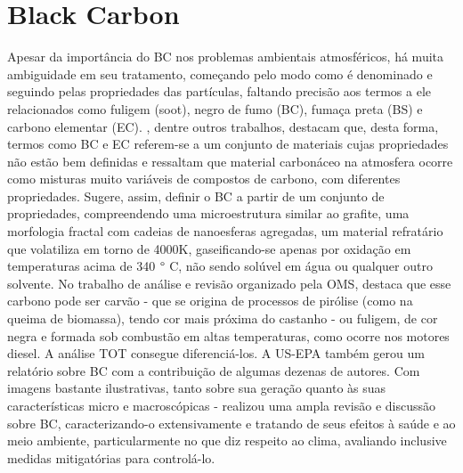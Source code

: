 \newpage
\section{Black Carbon}

Apesar da importância do BC nos problemas ambientais atmosféricos, há muita 
ambiguidade em seu tratamento, começando pelo modo como é denominado e seguindo
pelas propriedades das partículas, faltando precisão aos termos a ele 
relacionados como fuligem (soot), negro de fumo (BC), fumaça preta (BS) e 
carbono elementar (EC). \citet{petzold2013}, dentre outros trabalhos, 
destacam que, desta forma, termos como BC e EC referem-se a um conjunto de 
materiais cujas propriedades não estão bem definidas e ressaltam que material 
carbonáceo na atmosfera ocorre como misturas muito variáveis de compostos de 
carbono, com diferentes propriedades. Sugere, assim, definir o BC a partir de 
um conjunto de propriedades, compreendendo uma microestrutura similar ao grafite,
uma morfologia fractal com cadeias de nanoesferas agregadas, um material 
refratário que volatiliza em torno de 4000K, gaseificando-se apenas por oxidação
em temperaturas acima de 340 $\degree$ C, não sendo solúvel em água ou qualquer
outro solvente. No trabalho de análise e revisão organizado pela OMS, 
\citet{janssen2012} destaca que esse carbono pode ser carvão - que se origina
de processos de pirólise (como na queima de biomassa), tendo cor mais próxima do
castanho - ou fuligem, de cor negra e formada sob combustão em altas 
temperaturas, como ocorre nos motores diesel. A análise TOT consegue 
diferenciá-los. A US-EPA também gerou um relatório sobre BC \citep{epa2012} com
a contribuição de algumas dezenas de autores. Com imagens bastante ilustrativas, 
tanto sobre sua geração quanto às suas características micro e macroscópicas - 
realizou uma ampla revisão e 
discussão sobre BC, caracterizando-o extensivamente e tratando de seus efeitos 
à saúde e ao meio ambiente, particularmente no que diz respeito ao clima, 
avaliando inclusive medidas mitigatórias para controlá-lo. 

